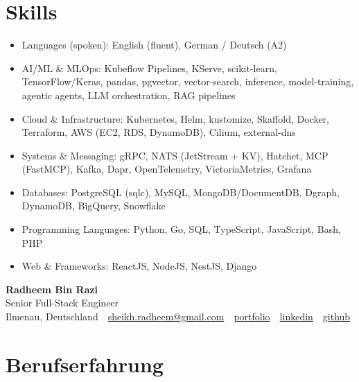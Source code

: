 \documentclass[10pt,a4paper]{resume}
\makeatletter
\newcommand{\Portfolio}{https://radheem.github.io/my-cv}
\newcommand{\PortfolioText}{portfolio}
\newcommand{\GitHub}{https://github.com/radheem}
\newcommand{\LinkedIn}{https://www.linkedin.com/in/radheem-razi}
\newcommand{\Email}{sheikh.radheem@gmail.com}
\makeatother
\begin{document}
\section{Skills}

\begin{itemize}[leftmargin=1.4em,nosep,topsep=2pt]
  \item Languages (spoken): English (fluent), German / Deutsch (A2)
  \item AI/ML \& MLOps: Kubeflow Pipelines, KServe, scikit-learn, TensorFlow/Keras, pandas, pgvector, vector-search, inference, model-training, agentic agents, LLM orchestration, RAG pipelines
  \item Cloud \& Infrastructure: Kubernetes, Helm, kustomize, Skaffold, Docker, Terraform, AWS (EC2, RDS, DynamoDB), Cilium, external-dns
  \item Systems \& Messaging: gRPC, NATS (JetStream + KV), Hatchet, MCP (FastMCP), Kafka, Dapr, OpenTelemetry, VictoriaMetrics, Grafana
  \item Databases: PostgreSQL (sqlc), MySQL, MongoDB/DocumentDB, Dgraph, DynamoDB, BigQuery, Snowflake
  \item Programming Languages: Python, Go, SQL, TypeScript, JavaScript, Bash, PHP
  \item Web \& Frameworks: ReactJS, NodeJS, NestJS, Django
\end{itemize}

\clearpage
{}

\begin{center}
  {\huge\bfseries Radheem Bin Razi}\\[3pt]
  {\large Senior Full-Stack Engineer}\\[6pt]
  \small
  Ilmenau, Deutschland \,\textbar\,
  \href{mailto:\Email}{\Email} \,\textbar\,
  \href{\Portfolio}{\PortfolioText} \,\textbar\,
  \href{\LinkedIn}{linkedin} \,\textbar\,
  \href{\GitHub}{github}
\end{center}
\vspace{2pt}

\section{Berufserfahrung}
\end{document}
